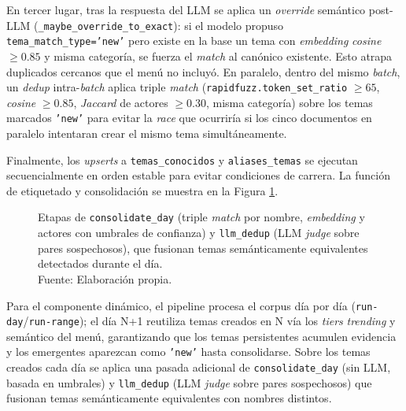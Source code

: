 En tercer lugar, tras la respuesta del LLM se aplica un \textit{override}
semántico post-LLM (\texttt{\_maybe\_override\_to\_exact}): si el modelo propuso
\texttt{tema\_match\_type='new'} pero existe en la base un tema con
\textit{embedding} \textit{cosine} $\geq 0.85$ y misma categoría, se fuerza el
\textit{match} al canónico existente. Esto atrapa duplicados cercanos que el menú
no incluyó. En paralelo, dentro del mismo \textit{batch}, un \textit{dedup}
intra-\textit{batch} aplica triple \textit{match}
(\texttt{rapidfuzz.token\_set\_ratio} $\geq 65$, \textit{cosine} $\geq 0.85$,
\textit{Jaccard} de actores $\geq 0.30$, misma categoría) sobre los temas marcados
\texttt{'new'} para evitar la \textit{race} que ocurriría si los cinco documentos
en paralelo intentaran crear el mismo tema simultáneamente.

Finalmente, los \textit{upserts} a \texttt{temas\_conocidos} y
\texttt{aliases\_temas} se ejecutan secuencialmente en orden estable para evitar
condiciones de carrera. La función de etiquetado y consolidación se muestra en la
Figura \ref{5:fig19}.

\begin{figure}[!ht]
    \begin{center}
        \resizebox{0.85\textwidth}{!}{}
        \caption[Etapa de consolidación y deduplicación de temas]{Etapas de \texttt{consolidate\_day} (triple \textit{match} por nombre, \textit{embedding} y actores con umbrales de confianza) y \texttt{llm\_dedup} (LLM \textit{judge} sobre pares sospechosos), que fusionan temas semánticamente equivalentes detectados durante el día.\\
            Fuente: Elaboración propia.}
        \label{5:fig19}
    \end{center}
\end{figure}

Para el componente dinámico, el pipeline procesa el corpus día por día
(\texttt{run-day}/\texttt{run-range}); el día N+1 reutiliza temas creados en N
vía los \textit{tiers} \textit{trending} y semántico del menú, garantizando que
los temas persistentes acumulen evidencia y los emergentes aparezcan como
\texttt{'new'} hasta consolidarse. Sobre los temas creados cada día se aplica una
pasada adicional de \texttt{consolidate\_day} (sin LLM, basada en umbrales) y
\texttt{llm\_dedup} (LLM \textit{judge} sobre pares sospechosos) que fusionan
temas semánticamente equivalentes con nombres distintos.

